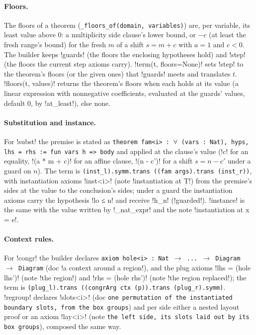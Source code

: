 \paragraph{Floors.} The floors of a theorem (\texttt{\_\allowbreak{}floors\_\allowbreak{}of(\allowbreak{}domain,\allowbreak{} variables)}) are, per variable, its least value above $0$: a multiplicity side clause's lower bound, or $-c$ (at least the fresh range's bound) for the fresh $m$ of a shift $s=m+c$ with $a=1$ and $c<0$. The builder keeps \code!guards! (the floors the enclosing hypotheses hold) and \code!step! (the floors the current step axioms carry). \py!term(t, floors=None)! sets \code!step! to the theorem's floors (or the given ones) that \code!guards! meets and translates $t$. \py!floors(t, values)! returns the theorem's floors when each holds at its value (a linear expression with nonnegative coefficients, evaluated at the guards' values, default $0$, by \py!at_least!), else none.

\paragraph{Substitution and instance.} For \code!subst! the premise is stated as \texttt{theorem fam<i> : $\forall$ (\allowbreak{}vars : Nat),\allowbreak{} hyps,\allowbreak{} lhs = rhs := fun vars h => body} and applied at the clause's value (\code!c! for an equality, \code!(a * m + c)! for an affine clause, \code!(n - c')! for a shift $s=n-c'$ under a guard on $n$). The term is \texttt{(\allowbreak{}inst\_\allowbreak{}l).\allowbreak{}symm.\allowbreak{}trans (\allowbreak{}(\allowbreak{}fam args).\allowbreak{}trans (\allowbreak{}inst\_\allowbreak{}r))}, with instantiation axioms \code!inst<i>! (note \code!instantiation at T!) from the premise's sides at the value to the conclusion's sides; under a guard the instantiation axioms carry the hypothesis \code!lo ≤ n! and receive \code!h_n! (\py!guarded!). \code!instance! is the same with the value written by \py!_nat_expr! and the note \code!instantiation at x = e!.

\paragraph{Context rules.} For \code!congr! the builder declares \texttt{axiom hole<i> : Nat $\to$ .\allowbreak{}.\allowbreak{}.\allowbreak{} $\to$ Diagram $\to$ Diagram} (doc \code!a context around a region!), and the plug axioms \code!lhs = (hole lhs')! (note \code!the region!) and \code!rhs = (hole rhs')! (note \code!the region replaced!); the term is \texttt{(\allowbreak{}plug\_\allowbreak{}l).\allowbreak{}trans (\allowbreak{}(\allowbreak{}congrArg ctx (\allowbreak{}p)).\allowbreak{}trans (\allowbreak{}plug\_\allowbreak{}r).\allowbreak{}symm)}. \code!regroup! declares \code!slots<i>! (doc \texttt{one permutation of the instantiated boundary slots,\allowbreak{} from the box groups}) and per side either a nested layout proof or an axiom \code!lay<i>! (note \texttt{the left side,\allowbreak{} its slots laid out by its box groups}), composed the same way.

